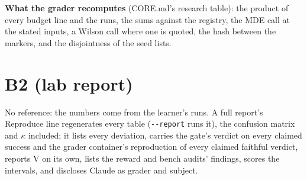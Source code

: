 \documentclass[11pt]{article}
\begin{document}
\textbf{What the grader recomputes} (CORE.md's research table): the product
of every budget line and the runs, the sums against the registry, the MDE call
at the stated inputs, a Wilson call where one is quoted, the hash between the
markers, and the disjointness of the seed lists.

\section*{B2 (lab report)}
No reference: the numbers come from the learner's runs. A full report's
Reproduce line regenerates every table (\verb+--report+ runs it), the
confusion matrix and $\kappa$ included; it lists every deviation, carries the
gate's verdict on every claimed success and the grader container's
reproduction of every claimed faithful verdict, reports V on its own, lists
the reward and bench audits' findings, scores the intervals, and discloses
Claude as grader and subject.

\end{document}
